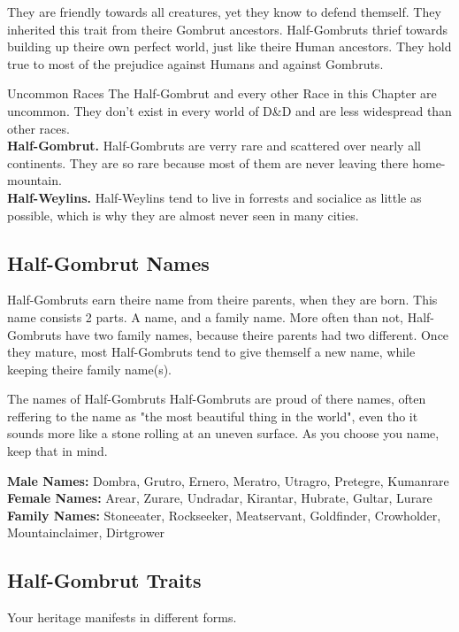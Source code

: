They are friendly towards all creatures, yet they know to defend themself. They inherited this trait from theire Gombrut ancestors. Half-Gombruts thrief towards building up theire own perfect world, just like theire Human ancestors. They hold true to most of the prejudice against Humans and against Gombruts. 

\begin{commentbox}{Uncommon Races}
The Half-Gombrut and every other Race in this Chapter are uncommon. They don't exist in every world of D\&D and are less widespread than other races.\\
\textbf{Half-Gombrut.} Half-Gombruts are verry rare and scattered over nearly all continents. They are so rare because most of them are never leaving there home-mountain.\\
\textbf{Half-Weylins.} Half-Weylins tend to live in forrests and socialice as little as possible, which is why they are almost never seen in many cities.\\
\end{commentbox}

\subsection{Half-Gombrut Names}
Half-Gombruts earn theire name from theire parents, when they are born. This name consists 2 parts. A name, and a family name. More often than not, Half-Gombruts have two family names, because theire parents had two different. Once they mature, most Half-Gombruts tend to give themself a new name, while keeping theire family name(s).

\begin{paperbox}{The names of Half-Gombruts}
Half-Gombruts are proud of there names, often reffering to the name as "the most beautiful thing in the world", even tho it sounds more like a stone rolling at an uneven surface. As you choose you name, keep that in mind.
\end{paperbox}

\textbf{Male Names:}
Dombra, Grutro, Ernero, Meratro, Utragro, Pretegre, Kumanrare
\textbf{Female Names:}
Arear, Zurare, Undradar, Kirantar, Hubrate, Gultar, Lurare
\textbf{Family Names:}
Stoneeater, Rockseeker, Meatservant, Goldfinder, Crowholder, Mountainclaimer, Dirtgrower

\subsection{Half-Gombrut Traits}
Your heritage manifests in different forms.

